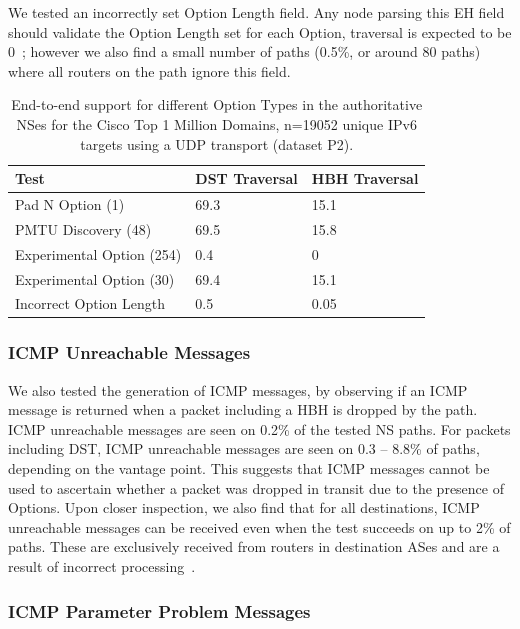 \documentclass[conference]{IEEEtran}
\begin{document}
We tested an incorrectly set Option Length field. Any node parsing this EH field should validate the Option Length set for each Option, traversal is expected to be 0~\cite{RFC8200}; however we also find a small number of paths (0.5\%, or around 80 paths) where all routers on the path ignore this field.

\begin{table}
\begin{tabular}{l|l|l}
Test                      & DST Traversal & HBH Traversal\\
\hline
Pad N Option (1)          & 69.3           & 15.1          \\
PMTU Discovery (48)       & 69.5           & 15.8          \\
Experimental Option (254) & 0.4            & 0             \\
Experimental Option (30)  & 69.4           & 15.1          \\
Incorrect Option Length   & 0.5            & 0.05            
\end{tabular}
\label{tbl:option_type_support}
\caption{End-to-end support for different Option Types in the authoritative NSes for the Cisco Top 1 Million Domains, n=19052 unique IPv6 targets using a UDP transport (dataset P2).}
\end{table}

\subsubsection{ICMP Unreachable Messages}

We also tested the generation of
ICMP messages, by observing if an ICMP message is returned when a packet including a HBH is dropped by the path. ICMP unreachable messages are seen on 0.2\% of the tested NS paths. For packets including DST, ICMP unreachable messages are seen on 0.3 – 8.8\% of paths, depending on the vantage point.
This suggests that ICMP messages cannot be used to ascertain whether a packet was dropped in transit due to the presence of Options.
Upon closer inspection, we also find that for all destinations, ICMP unreachable messages can be received even when the test succeeds on up to 2\% of paths. These are exclusively received from routers in destination ASes and are a result of incorrect processing~\cite{RFC8200}.

\subsubsection{ICMP Parameter Problem Messages}
\end{document}
